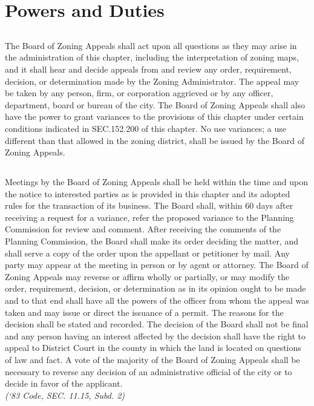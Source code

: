 \section{Powers and Duties}
\subsection{}
The Board of Zoning Appeals shall act upon all questions as they may arise in the administration of this chapter, including the interpretation of zoning maps, and it shall hear and decide appeals from and review any order, requirement, decision, or determination made by the Zoning Administrator. The appeal may be taken by any person, firm, or corporation aggrieved or by any officer, department, board or bureau of the city. The Board of Zoning Appeals shall also have the power to grant variances to the provisions of this chapter under certain conditions indicated in SEC.152.200 of this chapter. No use variances; a use different than that allowed in the zoning district, shall be issued by the Board of Zoning Appeals.
\subsection{}
Meetings by the Board of Zoning Appeals shall be held within the time and upon the notice to interested parties as is provided in this chapter and its adopted rules for the transaction of its business. The Board shall, within 60 days after receiving a request for a variance, refer the proposed variance to the Planning Commission for review and comment. After receiving the comments of the Planning Commission, the Board shall make its order deciding the matter, and shall serve a copy of the order upon the appellant or petitioner by mail. Any party may appear at the meeting in person or by agent or attorney. The Board of Zoning Appeals may reverse or affirm wholly or partially, or may modify the order, requirement, decision, or determination as in its opinion ought to be made and to that end shall have all the powers of the officer from whom the appeal was taken and may issue or direct the issuance of a permit. The reasons for the decision shall be stated and recorded.  The decision of the Board shall not be final and any person having an interest affected by the decision shall have the right to appeal to District Court in the county in which the land is located on questions of law and fact. A vote of the majority of the Board of Zoning Appeals shall be necessary to reverse any decision of an administrative official of the city or to decide in favor of the applicant.\\
\emph{(‘83 Code, SEC. 11.15, Subd. 2)}\\

